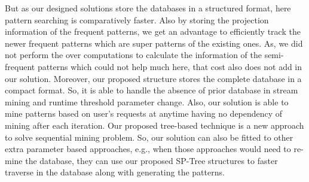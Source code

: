 But as our designed solutions store the databases in a structured format, here pattern searching is comparatively faster. Also by storing the projection information of the frequent patterns, we get an advantage to efficiently track the newer frequent patterns which are super patterns of the existing ones. As, we did not perform the over computations to calculate the information of the semi-frequent patterns which could not help much here, that cost also does not add in our solution. Moreover, our proposed structure stores the complete database in a compact format. So, it is able to handle the absence of prior database in stream mining and runtime threshold parameter change. Also, our solution is able to mine patterns based on user's requests at anytime having no dependency of mining after each iteration. Our proposed tree-based technique is a new approach to solve sequential mining problem. So, our solution can also be fitted to other extra parameter based approaches, e.g., when those approaches would need to re-mine the database, they can use our proposed SP-Tree structures to faster traverse in the database along with generating the patterns.  



